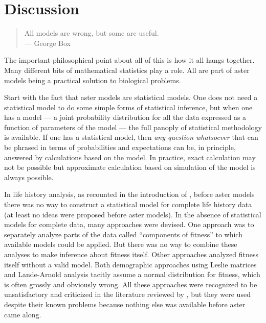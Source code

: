 \documentclass[11pt]{article}
\begin{document}
\section{Discussion} \label{sec:discuss}

\begin{quote}
All models are wrong, but some are useful. \\ \hspace*{\fill} --- George Box
\end{quote}

The important philosophical point about all of this is how it all hangs
together.  Many different bits of mathematical statistics play a role.
All are part of aster models being a practical solution to biological
problems.

Start with the fact that aster models are statistical models.  One does not
need a statistical model to do some simple forms of statistical inference,
but when one
has a model --- a joint probability distribution for all the data expressed
as a function of parameters of the model --- the full panoply of statistical
methodology is available.  If one has a statistical model, then \emph{any
question whatsoever} that can be phrased in terms of probabilities and
expectations can be, in principle, answered by calculations based on the model.
In practice, exact calculation may not be possible but approximate calculation
based on simulation of the model is always possible.

In life history analysis, as recounted in the introduction of \citet{aster2},
before aster models there was no way to construct a statistical model for
complete life history data (at least no ideas were proposed before aster
models).  In the absence of statistical models for complete data, many
approaches were devised.  One approach was to separately analyze parts
of the data called ``components of fitness'' to which available models
could be applied.  But there was no way to combine these analyses to
make inference about fitness itself.  Other approaches analyzed fitness
itself without a valid model.  Both demographic approaches using Leslie
matrices and Lande-Arnold analysis \citep[see][for references]{aster2}
tacitly assume a normal
distribution for fitness, which is often grossly and obviously wrong.
All these approaches
were recognized to be unsatisfactory and criticized in the literature
reviewed by \citet{aster2}, but they were used despite their
known problems because nothing else was available before aster came along.
\end{document}
